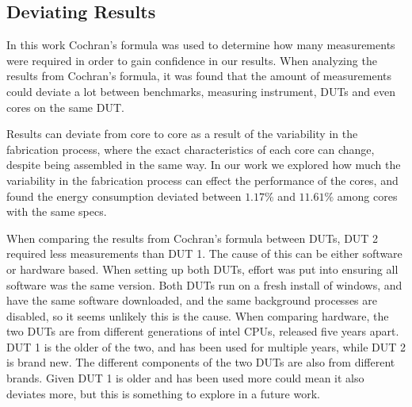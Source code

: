 \subsection{Deviating Results}

In this work Cochran's formula was used to determine how many measurements were required in order to gain confidence in our results. When analyzing the results from Cochran's formula, it was found that the amount of measurements could deviate a lot between benchmarks, measuring instrument, DUTs and even cores on the same DUT.

Results can deviate from core to core as a result of the variability in the fabrication process, where the exact characteristics of each core can change, despite being assembled in the same way.\cite{Mauzy2020} In our work we explored how much the variability in the fabrication process can effect the performance of the cores, and found the energy consumption deviated between $1.17\%$ and $11.61\%$ among cores with the same specs. %

When comparing the results from Cochran's formula between DUTs, DUT 2 required less measurements than DUT 1. The cause of this can be either software or hardware based. When setting up both DUTs, effort was put into ensuring all software was the same version. Both DUTs run on a fresh install of windows, and have the same software downloaded, and the same background processes are disabled, so it seems unlikely this is the cause. When comparing hardware, the two DUTs are from different generations of intel CPUs, released five years apart. DUT 1 is the older of the two, and has been used for multiple years, while DUT 2 is brand new. The different components of the two DUTs are also from different brands. Given DUT 1 is older and has been used more could mean it also deviates more, but this is something to explore in a future work. %




